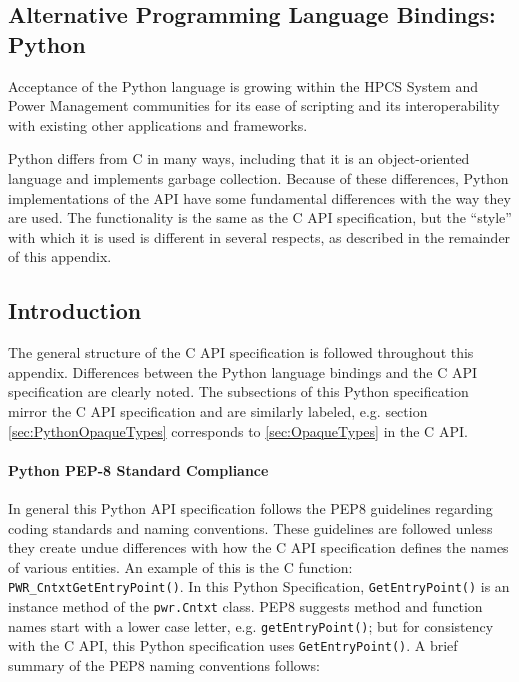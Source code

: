 \documentclass[12pt]{report} %
\begin{document}
\begin{appendices}
		\chapter{Alternative Programming Language Bindings: Python}
		\lstset{language=Python,keepspaces=true}
Acceptance of the Python language is growing within the HPCS System and Power
Management communities for its ease of scripting and its interoperability with
existing other applications and frameworks.

Python differs from C in many ways, including that it is an
object-oriented language and implements garbage collection.  Because of these differences, Python
implementations of the API have some fundamental differences with the way they
are used. The functionality is the same as the C API specification, but the
``style'' with which it is used is different in several respects, as described
in the remainder of this appendix.

\section{Introduction}\label{sec:PythonIntroduction}
The general structure of the C API specification is followed throughout this
appendix. Differences between the Python language bindings and the C API specification
are clearly noted. The subsections of this Python specification mirror the C
API specification and are similarly labeled, e.g. section
\ref{sec:PythonOpaqueTypes} corresponds to \ref{sec:OpaqueTypes} in the C API.

\subsubsection{Python PEP-8 Standard Compliance}
\label{sec:PythonPEP8StandardCompliance:GrpCreate}

In general this Python API specification follows the PEP8 guidelines
regarding coding standards and naming conventions. These guidelines are
followed unless they create undue differences with how the C API specification
defines the names of various entities. An example of this is the C function:
\texttt{PWR_CntxtGetEntryPoint()}. In this Python Specification,
\texttt{GetEntryPoint()} is an instance method of the \texttt{pwr.Cntxt} class.
PEP8 suggests method and function names start with a lower case letter, e.g.
\texttt{getEntryPoint()}; but for consistency with the C API, this Python
specification uses \texttt{GetEntryPoint()}. A brief summary of the
PEP8 naming conventions follows:


\end{appendices}
\end{document}

